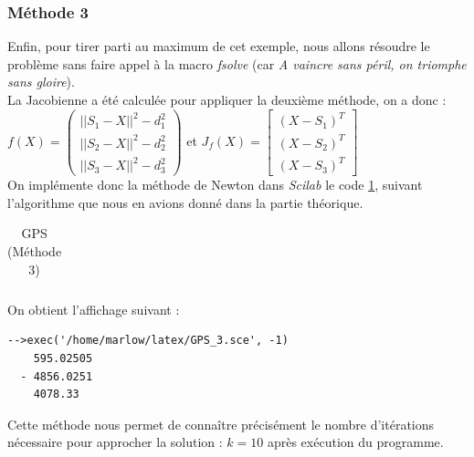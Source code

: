 \documentclass[a4paper,10pt]{report}
\begin{document}
\subsubsection{Méthode 3}
Enfin, pour tirer parti au maximum de cet exemple, nous allons résoudre le problème sans faire appel à la macro \textit{fsolve} (car \textit{A vaincre sans péril, on triomphe sans gloire}).\\
La Jacobienne a été calculée pour appliquer la deuxième méthode, on a donc : $f(X)=\left( \begin{array}{c} ||S_1-X||^2-d_1^2 \\ ||S_2-X||^2-d_2^2 \\ ||S_3-X||^2-d_3^2 \end{array} \right)$ et
$J_f(X) = \left[ \begin{array}{c} (X-S_1)^T \\ (X-S_2)^T \\ (X-S_3)^T \end{array} \right]$\\
On implémente donc la méthode de Newton dans \textit{Scilab} le code \ref{GPS3}, suivant l'algorithme que nous en avions donné dans la partie théorique.

\begin{table}[H]
\caption{GPS (Méthode 3)}
\begin{tabular}{l}
\\
\end{tabular}
\label{GPS3}
\end{table}

On obtient l'affichage suivant : \begin{verbatim}
-->exec('/home/marlow/latex/GPS_3.sce', -1)
    595.02505  
  - 4856.0251  
    4078.33    
\end{verbatim}
Cette méthode nous permet de connaître précisément le nombre d'itérations nécessaire pour approcher la solution : $k=10$ après exécution du programme.

\newpage
\end{document}
